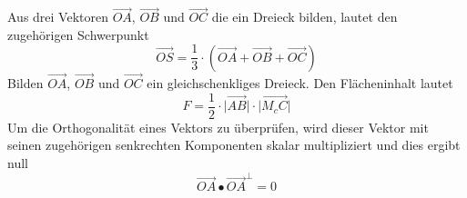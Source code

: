 Aus drei Vektoren $\overrightarrow{OA}$, $\overrightarrow{OB}$ und $\overrightarrow{OC}$ die ein Dreieck bilden, lautet den zugehörigen Schwerpunkt
\begin{equation}
\boxed{\overrightarrow{OS}=\dfrac{1}{3}\cdot\left(\overrightarrow{OA}+\overrightarrow{OB}+\overrightarrow{OC}\right)}
\end{equation}
Bilden $\overrightarrow{OA}$, $\overrightarrow{OB}$ und $\overrightarrow{OC}$ ein gleichschenkliges Dreieck. Den Flächeninhalt lautet
\begin{equation}
\boxed{F=\dfrac{1}{2}\cdot \Big\vert\overrightarrow{AB}\Big\vert\cdot \Big\vert\overrightarrow{M_cC}\Big\vert}
\end{equation}
Um die Orthogonalität eines Vektors zu überprüfen, wird dieser Vektor mit seinen zugehörigen senkrechten Komponenten skalar multipliziert und dies ergibt null
\begin{equation}
\boxed{\overrightarrow{OA}\bullet \overrightarrow{OA}^{\perp}=0}
\end{equation}

